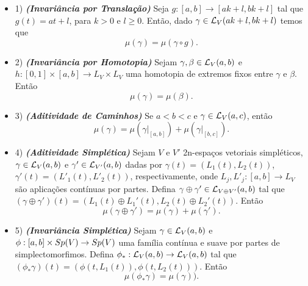 \documentclass{beamer}
\begin{document}
\begin{frame}
	\begin{itemize}
		\item 1) \textbf{\textit{(Invariância por Translação)}} Seja $g: [a,b] \to [ak+l, bk+l]$ tal que $g(t)=at+l$, para $k>0$ e $l\geq 0$. Então, dado $\gamma\in \caminhoslagrangianosV{ak+l}{bk+l}$ temos que 
		$$
		\mu(\gamma) = \mu(\gamma\circ g).
		$$
		\item 2) \textbf{\textit{(Invariância por Homotopia)}} Sejam $\gamma, \beta \in \caminhoslagrangianosV{a}{b}$ e $h:[0,1] \times [a,b] \to L_{V}\times L_{V}$ uma homotopia de extremos fixos entre $\gamma$ e $\beta$. Então
		$$
		\mu(\gamma) = \mu(\beta).
		$$
		\item 3) \textbf{\textit{(Aditividade de Caminhos)}} Se $a<b<c$ e $\gamma \in \caminhoslagrangianosV{a}{c}$, então $$
		\mu(\gamma)=\mu(\gamma|_{[a,b]})+\mu(\gamma|_{[b,c]}).
		$$
	\end{itemize}
	
\end{frame}

\begin{frame}
	\begin{itemize}
		\item 4) \textbf{\textit{(Aditividade Simplética)}} Sejam $V$ e $V'$ 2n-espaços vetoriais simpléticos, $\gamma \in \caminhoslagrangianosV{a}{b}$ e $\gamma' \in \caminhoslagrangianos{a}{b}{V'}$ dadas por $\gamma(t) = (L_{1}(t), L_{2}(t))$, $\gamma'(t) = (L'_{1}(t), L'_{2}(t))$, respectivamente, onde $L_{j}, L'_{j}: [a,b] \to L_{V}$ são aplicações contínuas por partes. Defina $\gamma\oplus\gamma' \in \caminhoslagrangianos{a}{b}{V\oplus V'}$ tal que $(\gamma\oplus\gamma' )(t) = (L_{1}(t)\oplus L_{1}'(t), L_{2}(t)\oplus L_{2}'(t))$. Então 
		$$
		\mu(\gamma\oplus\gamma' )= \mu(\gamma)+\mu(\gamma' ).
		$$
		\item 5) \textbf{\textit{(Invariância Simplética)}} Sejam $\gamma \in \caminhoslagrangianosV{a}{b}$ e $\phi:[a,b]\times \gruposimpletico{V} \to \gruposimpletico{V}$ uma família contínua e suave por partes de simplectomorfimos. Defina $\phi_{*}: \caminhoslagrangianosV{a}{b} \to \caminhoslagrangianosV{a}{b}$ tal que $ (\phi_{*}\gamma)(t) = (\phi(t, L_{1}(t)), \phi(t, L_{2}(t)))$. Então 
		$$
		\mu(\phi_{*}\gamma) = \mu(\gamma)).
		$$
	\end{itemize}
	
\end{frame}
\end{document}
